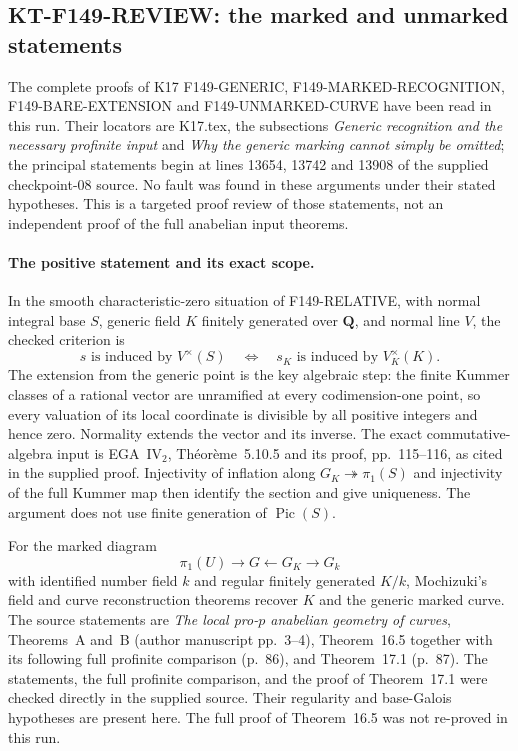 \subsection{KT-F149-REVIEW: the marked and unmarked statements}
\label{sec:kt-f149-review}

The complete proofs of K17 F149-GENERIC,
F149-MARKED-RECOGNITION, F149-BARE-EXTENSION and
F149-UNMARKED-CURVE have been read in this run. Their locators
are K17.tex, the subsections \emph{Generic recognition and the
necessary profinite input} and \emph{Why the generic marking
cannot simply be omitted}; the principal statements begin at
lines 13654, 13742 and 13908 of the supplied checkpoint-08
source. No fault was found in these arguments under their
stated hypotheses. This is a targeted proof review of those
statements, not an independent proof of the full anabelian
input theorems.

\paragraph{The positive statement and its exact scope.}
In the smooth characteristic-zero situation of F149-RELATIVE,
with normal integral base $S$, generic field $K$ finitely
generated over $\mathbf Q$, and normal line $V$, the checked
criterion is
\[
 s\text{ is induced by }V^\times(S)
 \quad\Longleftrightarrow\quad
 s_K\text{ is induced by }V_K^\times(K).
                                                               \tag{FR.1}
\]
The extension from the generic point is the key algebraic
step: the finite Kummer classes of a rational vector are
unramified at every codimension-one point, so every valuation
of its local coordinate is divisible by all positive integers
and hence zero. Normality extends the vector and its inverse.
The exact commutative-algebra input is EGA~IV$_2$,
Th\'eor\`eme~5.10.5 and its proof, pp.~115--116, as cited
in the supplied proof. Injectivity of inflation along
$G_K\twoheadrightarrow\pi_1(S)$ and injectivity of the full
Kummer map then identify the section and give uniqueness.
The argument does not use finite generation of $\operatorname{Pic}(S)$.

For the marked diagram
\[
 \pi_1(U)\longrightarrow G\longleftarrow G_K
                  \longrightarrow G_k
\]
with identified number field $k$ and regular finitely
generated $K/k$, Mochizuki's field and curve reconstruction
theorems recover $K$ and the generic marked curve.
The source statements are \emph{The local pro-$p$ anabelian
geometry of curves}, Theorems~A and~B (author manuscript
pp.~3--4), Theorem~16.5 together with its following full
profinite comparison (p.~86), and Theorem~17.1 (p.~87).
The statements, the full profinite comparison, and the proof
of Theorem~17.1 were checked directly in the supplied source.
Their regularity and base-Galois hypotheses are present here.
The full proof of Theorem~16.5 was not re-proved in this run.

